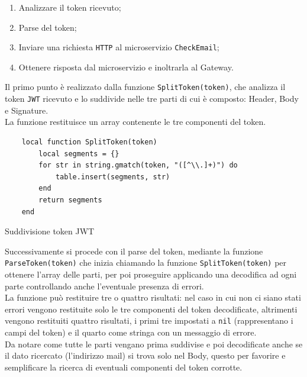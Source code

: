 \begin{enumerate}
	\item Analizzare il token ricevuto;
	\item Parse del token;
	\item Inviare una richiesta \texttt{HTTP} al microservizio \texttt{CheckEmail};
	\item Ottenere risposta dal microservizio e inoltrarla al Gateway.
\end{enumerate}

Il primo punto è realizzato dalla funzione \texttt{SplitToken(token)}, che analizza il token \texttt{JWT} ricevuto e lo suddivide nelle tre parti di cui è composto: Header, Body e Signature.\\
La funzione restituisce un array contenente le tre componenti del token.

\begin{algorithm}
\centering
\begin{verbatim}
	local function SplitToken(token)
		local segments = {}
		for str in string.gmatch(token, "([^\\.]+)") do
			table.insert(segments, str)
		end
		return segments
	end
\end{verbatim}
\caption{Suddivisione token JWT}\label{alg:splittoken}
\end{algorithm}

Successivamente si procede con il parse del token, mediante la funzione \texttt{ParseToken(token)} che inizia chiamando la funzione \texttt{SplitToken(token)}
per ottenere l'array delle parti, per poi proseguire applicando una decodifica ad ogni parte controllando anche l'eventuale presenza di errori.\\
La funzione può restituire tre o quattro risultati: nel caso in cui non ci siano stati errori vengono restituite solo le tre componenti del token decodificate, altrimenti 
vengono restituiti quattro risultati, i primi tre impostati a \texttt{nil} (rappresentano i campi del token) e il quarto come stringa con un messaggio di errore.\\
Da notare come tutte le parti vengano prima suddivise e poi decodificate anche se il dato ricercato (l'indirizzo mail) si trova solo nel Body, questo per favorire e semplificare 
la ricerca di eventuali componenti del token corrotte.

